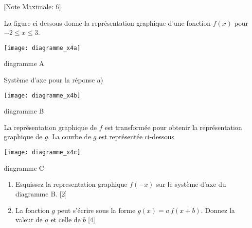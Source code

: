 \begin{question}
  \hspace*{\fill} [Note Maximale: 6]\par
  \medskip
  \begin{center} %
    \noindent La figure ci-dessous donne la représentation graphique d'une fonction $f(x)$ pour $ -2 \le x \le 3$.\par
    \texttt{[image: diagramme\_x4a]}\par
    \noindent diagramme A\par
  \end{center} %
  \begin{center} %
    \noindent Système d'axe pour la réponse a)\par
    \texttt{[image: diagramme\_x4b]}\par
    \noindent diagramme B\par
  \end{center} %
  \begin{center} %
    \noindent La représentation graphique de $f$ est transformée pour obtenir la représentation graphique de $g$. La courbe de $g$ est représentée ci-dessous \par
    \texttt{[image: diagramme\_x4c]}\par
    \noindent diagramme C\par
  \end{center} %

  \begin{enumerate}[label=(\alph*)]
    \item Esquissez la representation graphique $f(-x)$ sur le système d'axe du diagramme B.\hspace*{\fill} [2]
    \item La fonction $g$  peut s'écrire sous la forme $g(x) = a\,f(x + b)$. Donnez la valeur de $a$ et celle de $b$\hspace*{\fill} [4]
  \end{enumerate}
\end{question}
